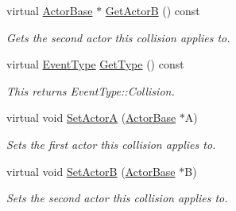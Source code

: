 \begin{DoxyCompactItemize}
virtual \hyperlink{classMezzanine_1_1ActorBase}{ActorBase} $\ast$ \hyperlink{classMezzanine_1_1EventCollision_ad3d7b44e680425d33bb2556de4d9a056}{GetActorB} () const 
\begin{DoxyCompactList}\small\item\em Gets the second actor this collision applies to. \item\end{DoxyCompactList}\item 
virtual \hyperlink{classMezzanine_1_1EventBase_ab85e31e97753b7e7ecb098f82526baef}{EventType} \hyperlink{classMezzanine_1_1EventCollision_af5d9f7eb0ee0ce22b0dd5dfbafc8f297}{GetType} () const 
\begin{DoxyCompactList}\small\item\em This returns EventType::Collision. \item\end{DoxyCompactList}\item 
virtual void \hyperlink{classMezzanine_1_1EventCollision_a90e9b3a89762db6a3c55aa262833bcd7}{SetActorA} (\hyperlink{classMezzanine_1_1ActorBase}{ActorBase} $\ast$A)
\begin{DoxyCompactList}\small\item\em Sets the first actor this collision applies to. \item\end{DoxyCompactList}\item 
virtual void \hyperlink{classMezzanine_1_1EventCollision_aef6da3acdc9879b21990cb25fa285304}{SetActorB} (\hyperlink{classMezzanine_1_1ActorBase}{ActorBase} $\ast$B)
\begin{DoxyCompactList}\small\item\em Sets the second actor this collision applies to. \item\end{DoxyCompactList}\end{DoxyCompactItemize}
